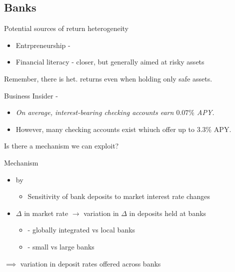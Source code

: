 \documentclass{beamer}
\begin{document}

\subsection{Banks}
\begin{frame}{Potential sources of return heterogeneity}
  \begin{itemize}
  \item Entrpreneurship - 
  \item Financial literacy - closer, but generally aimed at risky assets
    \end{itemize}

    \vspace{2.5mm}
    Remember, there is het. returns even when holding only safe assets.  

     \vspace{2.5mm}
     \par Business Insider - 
     \begin{itemize}
     \item \textit{On average, interest-bearing checking accounts earn $0.07\%$ APY.}
       \item However, many checking accounts exist whiuch offer up to 3.3\% APY.
  \end{itemize}

   \vspace{2.5mm}
     \par Is there a mechanism we can exploit?
  \end{frame}


\begin{frame}{Mechanism}

\begin{itemize}
    \item {} by  \cite{Drechsler2017}
      \begin{itemize}
      \item Sensitivity of bank deposits to market interest rate changes
      \end{itemize}
      \end{itemize}
  
 \begin{itemize}
  \item $\Delta$ in market rate $\rightarrow$ variation in $\Delta$ in deposits held at banks
    \begin{itemize}
  \item \cite{Sarkisyan2021} - globally integrated vs local banks
  \item \cite{dAvernas2024} - small vs large banks
    \end{itemize}
  \end{itemize}

  \vspace{2.5mm}
  $\implies$ variation in deposit rates offered across banks
  
\end{frame}
\end{document}
